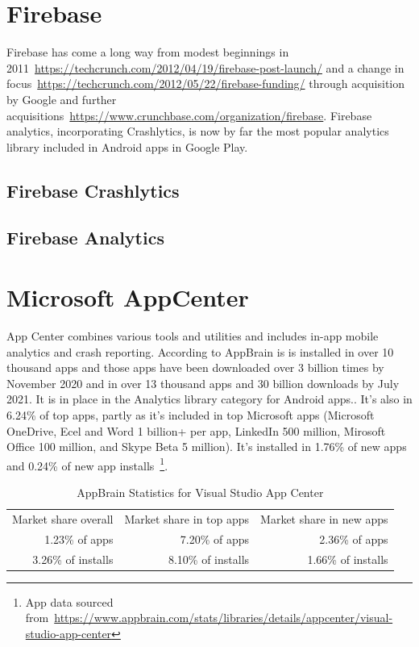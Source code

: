 \section{Firebase}
Firebase has come a long way from modest beginnings in 2011~\url{https://techcrunch.com/2012/04/19/firebase-post-launch/} and a change in focus~\url{https://techcrunch.com/2012/05/22/firebase-funding/} through acquisition by Google and further acquisitions~\url{https://www.crunchbase.com/organization/firebase}. Firebase analytics, incorporating Crashlytics, is now by far the most popular analytics library included in Android apps in Google Play. 

\subsection{Firebase Crashlytics}

\subsection{Firebase Analytics}


\section{Microsoft AppCenter}
App Center combines various tools and utilities and includes in-app mobile analytics and crash reporting. According to AppBrain is is installed in over 10 thousand apps and those apps have been downloaded over 3 billion times by  November 2020 and in over 13 thousand apps and 30 billion downloads by  July 2021. It is in  place in the Analytics library category for Android apps.. It's also in 6.24\% of top apps, partly as it's included in top Microsoft apps (Microsoft OneDrive, Ecel and Word 1 billion+ per app, LinkedIn 500 million, Mirosoft Office 100 million, and Skype Beta 5 million). It's installed in 1.76\% of new apps and 0.24\% of new app installs~\footnote{App data sourced from~\url{https://www.appbrain.com/stats/libraries/details/appcenter/visual-studio-app-center}}.  

\begin{table}[htbp!]
    \centering
    \footnotesize
    \begin{tabular}{rrr}
      Market share overall  &Market share in top apps &Market share in new apps  \\
      1.23\% of apps	  &7.20\% of apps &2.36\% of apps\\
      3.26\% of installs &8.10\% of installs &1.66\% of installs \\
    \end{tabular}
    \caption{AppBrain Statistics for Visual Studio App Center}
    \label{tab:appbrain_statistics_appcenter}
\end{table}


